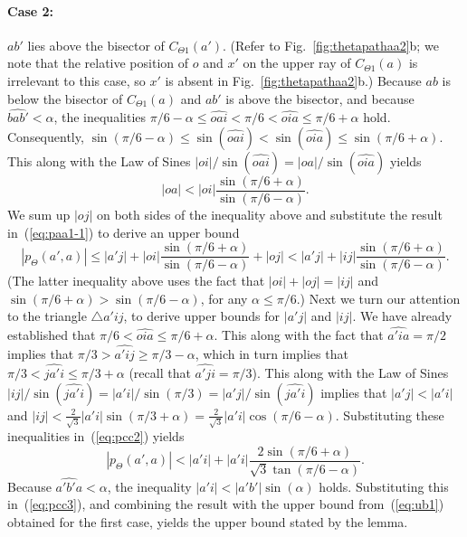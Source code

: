\documentclass[11pt]{article}
\newcommand\cone{{C}}
\newcommand\ang[1]{\widehat{#1}}
\begin{document}
\paragraph{Case 2:} $ab'$ lies above the bisector of $\cone_{\Theta1}(a')$. (Refer to Fig.~\ref{fig:thetapathaa2}b;
we note that the relative position of $o$ and $x'$ on the upper ray of $C_{\Theta1}(a)$ is irrelevant to this case, so $x'$ is absent in Fig.~\ref{fig:thetapathaa2}b.)
Because $ab$ is below the bisector of $C_{\Theta1}(a)$ and $ab'$ is above the bisector, and because $\ang{bab'} < \alpha$, the inequalities $\pi/6 - \alpha \le \ang{oai} < \pi/6 < \ang{oia} \le \pi/6 + \alpha$ hold. Consequently,
$\sin(\pi/6 - \alpha) \le \sin(\ang{oai}) < \sin(\ang{oia}) \le \sin(\pi/6 + \alpha)$. This along with the Law of Sines $|oi|/\sin(\ang{oai}) = |oa|/\sin(\ang{oia})$ yields
\[
|oa| < |oi|\frac{\sin(\pi/6+\alpha)}{\sin(\pi/6-\alpha)}.
\]
We sum up $|oj|$ on both sides of the inequality above and substitute the result in~(\ref{eq:paa1-1}) to derive an upper bound
\begin{equation}
  |p_\Theta(a',a)| \le |a'j| + |oi|\frac{\sin(\pi/6+\alpha)}{\sin(\pi/6-\alpha)} + |oj| < |a'j| + |ij|\frac{\sin(\pi/6+\alpha)}{\sin(\pi/6-\alpha)}.
\label{eq:pcc2}
\end{equation}
(The latter inequality above uses the fact that $|oi| + |oj| = |ij|$ and $\sin(\pi/6+\alpha) > \sin(\pi/6-\alpha)$, for any $\alpha \le \pi/6$.)
Next we turn our attention to the triangle $\triangle a'ij$, to derive upper bounds for $|a'j|$ and $|ij|$. We have already established that $\pi/6 < \ang{oia} \le \pi/6 + \alpha$. This along with the fact that $\ang{a'ia} = \pi/2$ implies that $\pi/3 > \ang{a'ij} \ge \pi/3-\alpha$, which in turn implies that $\pi/3 < \ang{ja'i} \le \pi/3+\alpha$ (recall that $\ang{a'ji} = \pi/3$). This along with the Law of Sines
$|ij|/\sin(\ang{ja'i}) = |a'i|/\sin(\pi/3) = |a'j|/\sin(\ang{ja'i})$ implies that $|a'j| < |a'i|$ and
$|ij| < \frac{2}{\sqrt{3}}|a'i|\sin(\pi/3+\alpha) = \frac{2}{\sqrt{3}}|a'i|\cos(\pi/6-\alpha)$.
Substituting these inequalities in~(\ref{eq:pcc2}) yields
\begin{equation}
|p_\Theta(a',a)| < |a'i| + |a'i|\frac{2\sin(\pi/6+\alpha)}{\sqrt{3}\tan(\pi/6-\alpha)}.
\label{eq:pcc3}
\end{equation}
Because $\ang{a'b'a} < \alpha$, the inequality $|a'i| < |a'b'|\sin(\alpha)$ holds. Substituting this in~(\ref{eq:pcc3}), and combining the result with the upper bound from~(\ref{eq:ub1}) obtained for the first case,
yields the upper bound stated by the lemma.
\end{document}
